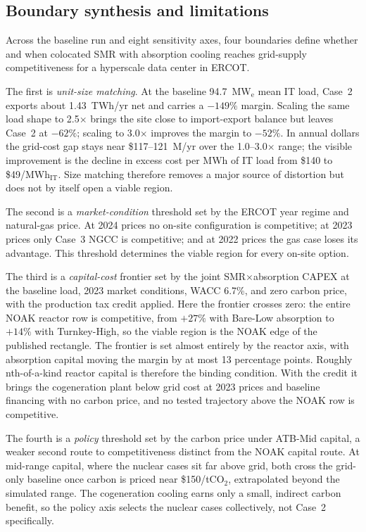 \documentclass[a4paper,fleqn]{cas-sc}
\begin{document}
\clearpage

\subsection{Boundary synthesis and limitations}
\label{sec:results:synthesis}

Across the baseline run and eight sensitivity axes, four boundaries define whether and when colocated SMR with absorption cooling reaches grid-supply competitiveness for a hyperscale data center in ERCOT.

The first is \emph{unit-size matching}. At the baseline 94.7~MW$_\mathrm{e}$ mean IT load, Case~2 exports about 1.43~TWh/yr net and carries a $-149\%$ margin. Scaling the same load shape to 2.5$\times$ brings the site close to import-export balance but leaves Case~2 at $-62\%$; scaling to 3.0$\times$ improves the margin to $-52\%$. In annual dollars the grid-cost gap stays near \$117--121~M/yr over the 1.0--3.0$\times$ range; the visible improvement is the decline in excess cost per MWh of IT load from \$140 to \$49/MWh$_\mathrm{IT}$. Size matching therefore removes a major source of distortion but does not by itself open a viable region.

The second is a \emph{market-condition} threshold set by the ERCOT year regime and natural-gas price. At 2024 prices no on-site configuration is competitive; at 2023 prices only Case~3 NGCC is competitive; and at 2022 prices the gas case loses its advantage. This threshold determines the viable region for every on-site option.

The third is a \emph{capital-cost} frontier set by the joint SMR$\times$absorption CAPEX at the baseline load, 2023 market conditions, WACC 6.7\%, and zero carbon price, with the production tax credit applied. Here the frontier crosses zero: the entire NOAK reactor row is competitive, from $+27\%$ with Bare-Low absorption to $+14\%$ with Turnkey-High, so the viable region is the NOAK edge of the published rectangle. The frontier is set almost entirely by the reactor axis, with absorption capital moving the margin by at most 13 percentage points. Roughly nth-of-a-kind reactor capital is therefore the binding condition. With the credit it brings the cogeneration plant below grid cost at 2023 prices and baseline financing with no carbon price, and no tested trajectory above the NOAK row is competitive.

The fourth is a \emph{policy} threshold set by the carbon price under ATB-Mid capital, a weaker second route to competitiveness distinct from the NOAK capital route. At mid-range capital, where the nuclear cases sit far above grid, both cross the grid-only baseline once carbon is priced near \$150/tCO$_2$, extrapolated beyond the simulated range. The cogeneration cooling earns only a small, indirect carbon benefit, so the policy axis selects the nuclear cases collectively, not Case~2 specifically.
\end{document}
